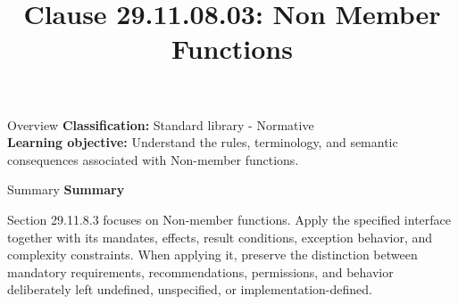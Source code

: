 \documentclass[10pt,letterpaper]{article}
\title{Clause 29.11.08.03: Non Member Functions}
\author{}
\date{}
\begin{document}
\maketitle
\begin{CornellOverviewBox}{Overview}
\textbf{Classification:} Standard library - Normative\\[2pt]
\textbf{Learning objective:} Understand the rules, terminology, and semantic consequences associated with Non-member functions.
\end{CornellOverviewBox}\begin{CornellSummaryBox}{Summary}
{\sffamily\bfseries\color{Accent} Summary}\par\vspace{3pt}Section 29.11.8.3 focuses on Non-member functions. Apply the specified interface together with its mandates, effects, result conditions, exception behavior, and complexity constraints. When applying it, preserve the distinction between mandatory requirements, recommendations, permissions, and behavior deliberately left undefined, unspecified, or implementation-defined.
\end{CornellSummaryBox}
\end{document}
